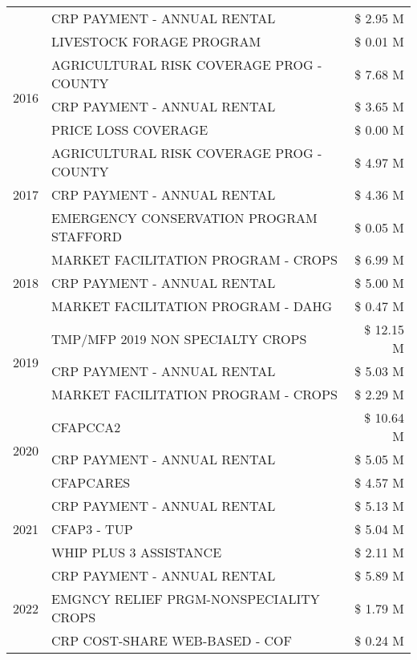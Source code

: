 \begin{tabular}{llr}
 & CRP PAYMENT - ANNUAL RENTAL & \$ 2.95 M \\
 & LIVESTOCK FORAGE PROGRAM & \$ 0.01 M \\
\cline{1-3}
\multirow[t]{3}{*}{2016} & AGRICULTURAL RISK COVERAGE PROG - COUNTY & \$ 7.68 M \\
 & CRP PAYMENT - ANNUAL RENTAL & \$ 3.65 M \\
 & PRICE LOSS COVERAGE & \$ 0.00 M \\
\cline{1-3}
\multirow[t]{3}{*}{2017} & AGRICULTURAL RISK COVERAGE PROG - COUNTY & \$ 4.97 M \\
 & CRP PAYMENT - ANNUAL RENTAL & \$ 4.36 M \\
 & EMERGENCY CONSERVATION PROGRAM STAFFORD & \$ 0.05 M \\
\cline{1-3}
\multirow[t]{3}{*}{2018} & MARKET FACILITATION PROGRAM - CROPS & \$ 6.99 M \\
 & CRP PAYMENT - ANNUAL RENTAL & \$ 5.00 M \\
 & MARKET FACILITATION PROGRAM - DAHG & \$ 0.47 M \\
\cline{1-3}
\multirow[t]{3}{*}{2019} & TMP/MFP 2019 NON SPECIALTY CROPS & \$ 12.15 M \\
 & CRP PAYMENT - ANNUAL RENTAL & \$ 5.03 M \\
 & MARKET FACILITATION PROGRAM - CROPS & \$ 2.29 M \\
\cline{1-3}
\multirow[t]{3}{*}{2020} & CFAPCCA2 & \$ 10.64 M \\
 & CRP PAYMENT - ANNUAL RENTAL & \$ 5.05 M \\
 & CFAPCARES & \$ 4.57 M \\
\cline{1-3}
\multirow[t]{3}{*}{2021} & CRP PAYMENT - ANNUAL RENTAL & \$ 5.13 M \\
 & CFAP3 - TUP & \$ 5.04 M \\
 & WHIP PLUS 3 ASSISTANCE & \$ 2.11 M \\
\cline{1-3}
\multirow[t]{3}{*}{2022} & CRP PAYMENT - ANNUAL RENTAL & \$ 5.89 M \\
 & EMGNCY RELIEF PRGM-NONSPECIALITY CROPS & \$ 1.79 M \\
 & CRP COST-SHARE WEB-BASED - COF & \$ 0.24 M \\
\cline{1-3}
\bottomrule
\end{tabular}
